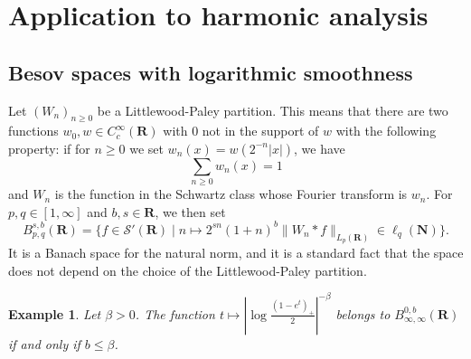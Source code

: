 \documentclass[10pt]{amsart}
\newcommand{\R}{\mathbf{R}}
\newcommand{\N}{\mathbf{N}}
\newtheorem{example}[theorem]{Example}
\begin{document}
\section{Application to harmonic analysis}\label{sec: harmonic}
\subsection{Besov spaces with logarithmic smoothness}\label{subsection:besov}
Let $(W_n)_{n \geq 0}$ be a Littlewood-Paley partition. This means that there are two functions $w_0,w \in C^\infty_c(\R)$ with $0$ not in the support of $w$ with the following property: if for $n\geq 0$ we set $w_n(x) = w(2^{-n}|x|)$, we have
\[ \sum_{n\geq 0} w_n(x) = 1\]
and $W_n$ is the function in the Schwartz class whose Fourier transform is $w_n$. For $p,q \in [1,\infty]$ and $b,s \in \R$, we then set
\[ B_{p,q}^{s,b}(\R) = \big\{ f \in \mathcal{S}'(\R)\mid  n \mapsto 2^{sn} (1+n)^b \|W_n \ast f\|_{L_p(\R)} \in \ell_q(\N)\big\}.\]
It is a Banach space for the natural norm, and it is a standard fact that the space does not depend on the choice of the Littlewood-Paley partition.
\begin{example}\label{ex:powerLogBesov}
Let $\beta>0$. The function $t \mapsto |\log \frac{(1-e^t)_+}{2}|^{-\beta}$ belongs to $B_{\infty,\infty}^{0,b}(\R)$ if and only if $b \leq \beta$.
\end{example}
\end{document}
